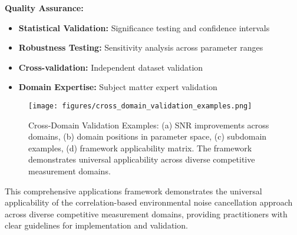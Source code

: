 \textbf{Quality Assurance:}
\begin{itemize}
    \item \textbf{Statistical Validation:} Significance testing and confidence intervals
    \item \textbf{Robustness Testing:} Sensitivity analysis across parameter ranges
    \item \textbf{Cross-validation:} Independent dataset validation
    \item \textbf{Domain Expertise:} Subject matter expert validation
\end{itemize}

\begin{figure}[h]
\centering
\texttt{[image: figures/cross\_domain\_validation\_examples.png]}
\caption{Cross-Domain Validation Examples: (a) SNR improvements across domains, (b) domain positions in parameter space, (c) subdomain examples, (d) framework applicability matrix. The framework demonstrates universal applicability across diverse competitive measurement domains.}
\label{fig:cross_domain}
\end{figure}

This comprehensive applications framework demonstrates the universal applicability of the correlation-based environmental noise cancellation approach across diverse competitive measurement domains, providing practitioners with clear guidelines for implementation and validation.
